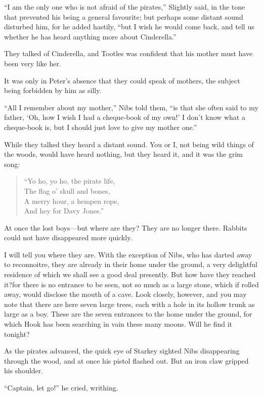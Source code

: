 “I am the only one who is not afraid of the pirates,” Slightly said,
in the tone that prevented his being a general favourite;
but perhaps some distant sound disturbed him, for he added hastily,
“but I wish he would come back, and tell us whether he has heard anything more about Cinderella.”

They talked of Cinderella, and Tootles was confident that his mother must have been very like her.

It was only in Peter’s absence that they could speak of mothers,
the subject being forbidden by him as silly.

“All I remember about my mother,” Nibs told them,
“is that she often said to my father, ‘Oh, how I wish I had a cheque‐book of my own!’
I don’t know what a cheque‐book is, but I should just love to give my mother one.”

While they talked they heard a distant sound.
You or I, not being wild things of the woods, would have heard nothing,
but they heard it, and it was the grim song:

\begin{verse}
	“Yo ho, yo ho, the pirate life,\\
	The flag o’ skull and bones,\\
	A merry hour, a hempen rope,\\
	And hey for Davy Jones.”
\end{verse}

At once the lost boys—but where are they?
They are no longer there.
Rabbits could not have disappeared more quickly.

I will tell you where they are.
With the exception of Nibs, who has darted away to reconnoitre,
they are already in their home under the ground,
a very delightful residence of which we shall see a good deal presently.
But how have they reached it?\@ for there is no entrance to be seen,
not so much as a large stone, which if rolled away, would disclose the mouth of a cave.
Look closely, however, and you may note that there are here seven large trees,
each with a hole in its hollow trunk as large as a boy.
These are the seven entrances to the home under the ground,
for which Hook has been searching in vain these many moons.
Will he find it tonight?

As the pirates advanced, the quick eye of Starkey sighted Nibs disappearing through the wood,
and at once his pistol flashed out.
But an iron claw gripped his shoulder.

“Captain, let go!\@” he cried, writhing.

